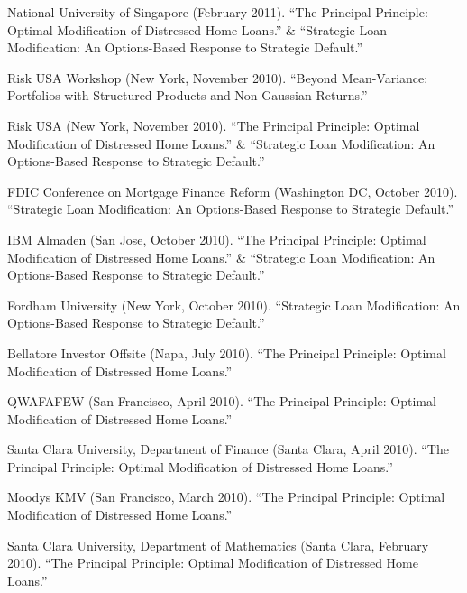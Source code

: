 \documentclass{article}
\begin{document}
\begin{etaremune}
{\item National University of Singapore (February 2011). 
``The Principal Principle: Optimal Modification of Distressed Home Loans.'' \& ``Strategic Loan Modification: An Options-Based Response to Strategic Default.''

\item Risk USA Workshop (New York, November 2010). 
``Beyond Mean-Variance: Portfolios with Structured Products  and Non-Gaussian Returns.''

\item Risk USA (New York, November 2010). 
``The Principal Principle: Optimal Modification of Distressed Home Loans.'' \& ``Strategic Loan Modification: An Options-Based Response to Strategic Default.''

\item FDIC Conference on Mortgage Finance Reform (Washington DC, October 2010). 
``Strategic Loan Modification: An Options-Based Response to Strategic Default.''

\item IBM Almaden (San Jose, October 2010). 
``The Principal Principle: Optimal Modification of Distressed Home Loans.'' \& ``Strategic Loan Modification: An Options-Based Response to Strategic Default.''

\item Fordham University (New York, October 2010). 
``Strategic Loan Modification: An Options-Based Response to Strategic Default.''

\item Bellatore Investor Offsite (Napa, July 2010).
``The Principal Principle: Optimal Modification of Distressed Home Loans.''

\item QWAFAFEW (San Francisco, April 2010).
``The Principal Principle: Optimal Modification of Distressed Home Loans.''

\item Santa Clara University, Department of Finance (Santa Clara, April 2010).
``The Principal Principle: Optimal Modification of Distressed Home Loans.''

\item Moodys KMV (San Francisco, March 2010).
``The Principal Principle: Optimal Modification of Distressed Home Loans.''

\item Santa Clara University, Department of Mathematics (Santa Clara, February 2010).
``The Principal Principle: Optimal Modification of Distressed Home Loans.''

}
\end{etaremune}
\end{document}
